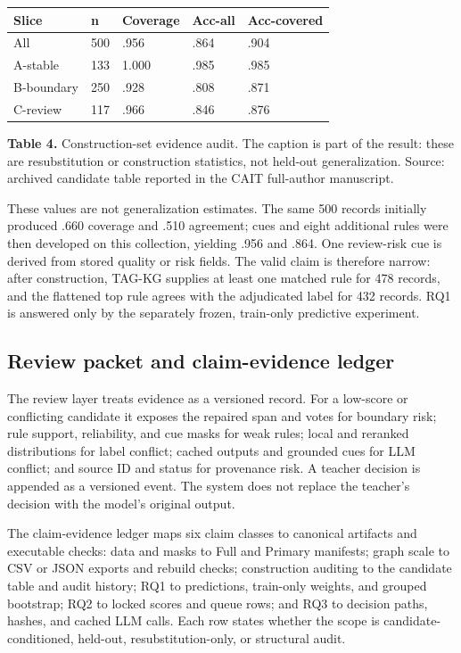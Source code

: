 \documentclass{CUP-JNL-NLP}
\begin{document}
\begin{table}[htbp]\centering\small\begin{tabularx}{\linewidth}{lXXXX}\toprule
Slice & n & Coverage & Acc-all & Acc-covered \\ \midrule
All & 500 & .956 & .864 & .904 \\
A-stable & 133 & 1.000 & .985 & .985 \\
B-boundary & 250 & .928 & .808 & .871 \\
C-review & 117 & .966 & .846 & .876 \\
\bottomrule\end{tabularx}\end{table}
\textbf{Table 4.} Construction-set evidence audit. The caption is part of the result: these are resubstitution or construction statistics, not held-out generalization. Source: archived candidate table reported in the CAIT full-author manuscript.

These values are not generalization estimates. The same 500 records initially produced .660 coverage and .510 agreement; cues and eight additional rules were then developed on this collection, yielding .956 and .864. One review-risk cue is derived from stored quality or risk fields. The valid claim is therefore narrow: after construction, TAG-KG supplies at least one matched rule for 478 records, and the flattened top rule agrees with the adjudicated label for 432 records. RQ1 is answered only by the separately frozen, train-only predictive experiment.

\subsection{Review packet and claim-evidence ledger}
The review layer treats evidence as a versioned record. For a low-score or conflicting candidate it exposes the repaired span and votes for boundary risk; rule support, reliability, and cue masks for weak rules; local and reranked distributions for label conflict; cached outputs and grounded cues for LLM conflict; and source ID and status for provenance risk. A teacher decision is appended as a versioned event. The system does not replace the teacher's decision with the model's original output.

The claim-evidence ledger maps six claim classes to canonical artifacts and executable checks: data and masks to Full and Primary manifests; graph scale to CSV or JSON exports and rebuild checks; construction auditing to the candidate table and audit history; RQ1 to predictions, train-only weights, and grouped bootstrap; RQ2 to locked scores and queue rows; and RQ3 to decision paths, hashes, and cached LLM calls. Each row states whether the scope is candidate-conditioned, held-out, resubstitution-only, or structural audit.
\end{document}
